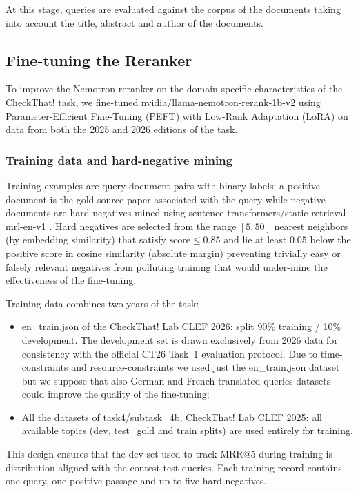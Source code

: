 At this stage, queries are evaluated against the corpus of the documents taking into account the title, abstract and author of the documents.

\subsection{Fine-tuning the Reranker} \label{sub:finetuning}
To improve the Nemotron reranker on the domain-specific characteristics of the CheckThat! task, we fine-tuned nvidia/llama-nemotron-rerank-1b-v2 using Parameter-Efficient Fine-Tuning (PEFT) with Low-Rank Adaptation (LoRA) on data from both the 2025 and 2026 editions of the task.

\subsubsection{Training data and hard-negative mining}
Training examples are query-document pairs with binary labels: a positive document is the gold source paper associated with the query while negative documents are hard negatives mined using sentence-transformers/static-retrieval-mrl-en-v1 \cite{static-retrieval-mrl-en-v1, reimers-2019-sentence-bert, kusupati2024matryoshka}. Hard negatives are selected from the range $[5, 50]$ nearest neighbors (by embedding similarity) that satisfy $\text{score} \leq 0.85$ and lie at least $0.05$ below the positive score in cosine similarity (absolute margin) preventing trivially easy or falsely relevant negatives from polluting training that would under-mine the effectiveness of the fine-tuning.

Training data combines two years of the task:
\begin{itemize}
    \item en\_train.json of the CheckThat! Lab CLEF 2026: split 90\% training / 10\% development. The development set is drawn exclusively from 2026 data for consistency with the official CT26 Task~1 evaluation protocol. Due to time-constraints and resource-constraints we used just the en\_train.json dataset but we suppose that also German and French translated queries datasets could improve the quality of the fine-tuning;
    \item All the datasets of task4/subtask\_4b, CheckThat! Lab CLEF 2025: all available topics (dev, test\_gold and train splits) are used entirely for training.
    
\end{itemize}
This design ensures that the dev set used to track MRR@5 during training is distribution-aligned with the contest test queries. Each training record contains one query, one positive passage and up to five hard negatives.

